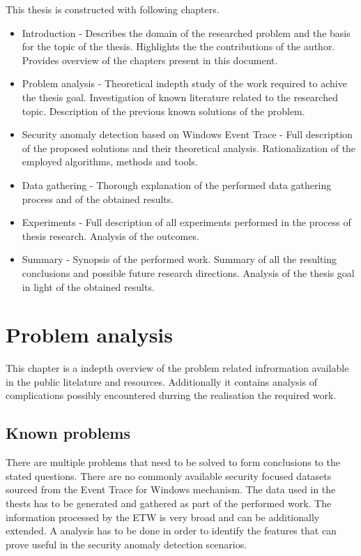 \documentclass[a4paper,twoside,12pt]{book}
\begin{document}
This thesis is constructed with following chapters.
\begin{itemize}
	\item Introduction - Describes the domain of the researched problem and the basis for the 
	topic of the thesis. Highlights the the contributions of the author. Provides overview of the 
	chapters present in this document.
	\item Problem analysis - Theoretical indepth study of the work required to achive the thesis
	goal. Investigation of known literature related to the researched topic. Description of the 
	previous known solutions of the problem. 
	\item Security anomaly detection based on Windows Event Trace - Full description of the proposed
	solutions and their theoretical analysis. Rationalization of the employed algorithms, methods 
	and tools.
	\item Data gathering - Thorough explanation of the performed data gathering process and of 
	the obtained results.
 	\item Experiments - Full description of all experiments performed in the process of thesis 
 	research. Analysis of the outcomes.
	\item Summary - Synopsis of the performed work. Summary of all the resulting conclusions and 
	possible future research directions. Analysis of the thesis goal in light of the obtained
	results. 
\end{itemize}

\chapter{Problem analysis}

This chapter is a indepth overview of the problem related infrormation available in the public 
litelature and resources. Additionally it contains analysis of complications possibly encountered
durring the realisation the required work.  

\section{Known problems}
There are multiple problems that need to be solved to form conclusions to the stated questions.
There are no commonly available security focused datasets sourced from the Event Trace for 
Windows mechanism. The data used in the thests has to be generated and gathered as part of the
performed work. The information processed by the ETW is very broad and can be additionally extended.
A analysis has to be done in order to identify the features that can prove useful in the security
anomaly detection scenarios. 
\end{document}
